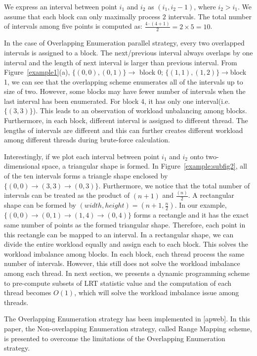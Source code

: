 \documentclass[10pt,journal,cspaper,compsoc]{IEEEtran}
\begin{document}
 We express an interval between point $i_1$ and $i_2$ as $(i_1,i_2-1)$, where $i_2 > i_1$. We assume that each block can only maximally process $2$ intervals. The total number of intervals among five points is computed as: ${\frac{4 \cdot (4+1)}{2}}=2\times 5=10$.

  In the case of Overlapping Enumeration parallel strategy, every two overlapped intervals is assigned to a block. The next/previous interval always overlaps by one interval and the length of next interval is larger than previous interval.  From Figure~\ref{example1}(a), $\{(0,0),(0,1)\} \rightarrow$ block 0; $\{(1,1),(1,2)\} \rightarrow$block 1, we can see that the overlapping scheme enumerates all of the intervals up to size of two. However, some blocks may have fewer number of intervals when the last interval has been enumerated. For block 4, it has only one interval(i.e. $\{(3,3)\}$). This leads to an observation of workload unbalancing among blocks. Furthermore, in each block, different interval is assigned to different thread. The lengths of intervals are different and this can further creates different workload among different threads during brute-force calculation.

Interestingly, if we plot each interval between point $i_1$ and $i_2$ onto two-dimensional space, a triangular shape is formed. In Figure~\ref{example:subfig2}, all of the ten intervals forms a triangle shape enclosed by $\{(0,0)\rightarrow(3,3)\rightarrow(0,3)\}$. Furthermore, we notice that the total number of intervals can be treated as the product of $(n+1)$ and ${\frac{(n)}{2}}$. A rectangular shape can be formed by $(width,height)=(n+1,{\frac{n}{2}})$. In our example, $\{(0,0)\rightarrow(0,1)\rightarrow(1,4)\rightarrow(0,4)\}$ forms a rectangle and it has the exact same number of points as the formed triangular shape. Therefore, each point in this rectangle can be mapped to an interval. In a rectangular shape, we can divide the entire workload equally and assign each to each block. This solves the workload imbalance among blocks. In each block, each thread process the same number of intervals. However, this still does not solve the workload imbalance among each thread. In next section, we presents a dynamic programming scheme to pre-compute subsets of LRT statistic value and the computation of each thread becomes $O(1)$, which will solve the workload imbalance issue among threads.


The Overlapping Enumeration strategy has been implemented in [apweb]. In this paper, the Non-overlapping Enumeration strategy, called Range Mapping scheme, is presented to overcome the limitations of the Overlapping Enumeration strategy.
\end{document}
